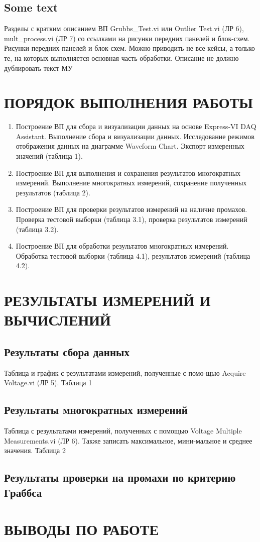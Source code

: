\documentclass[a4paper,14pt]{article}
\begin{document}
\subsection{Some text}
Разделы с кратким описанием ВП Grubbs\_Test.vi или Outlier Test.vi (ЛР 6), mult\_process.vi (ЛР 7) со ссылками на рисунки передних панелей и блок-схем. Рисунки передних панелей и блок-схем. Можно приводить не все кейсы, а только те, на которых выполняется основная часть обработки. Описание не должно дублировать текст МУ 

\section{ПОРЯДОК ВЫПОЛНЕНИЯ РАБОТЫ}
\begin{enumerate}
\item 	Построение ВП для сбора и визуализации данных на основе Express-VI DAQ Assistant.
 Выполнение сбора и визуализации данных. 
 Исследование режимов отображения данных на диаграмме Waveform Chart. 
 Экспорт измеренных значений (таблица 1).
\item 	Построение ВП для выполнения и сохранения результатов многократных измерений.
 Выполнение многократных измерений, сохранение полученных результатов (таблица 2).
\item 	Построение ВП для проверки результатов измерений на наличие промахов. 
Проверка тестовой выборки (таблица 3.1), проверка результатов измерений (таблица  3.2).
\item 	Построение ВП для обработки результатов многократных измерений. 
Обработка тестовой выборки (таблица 4.1), результатов измерений (таблица 4.2).
\end{enumerate}

\section{ РЕЗУЛЬТАТЫ ИЗМЕРЕНИЙ И ВЫЧИСЛЕНИЙ}

\subsection{Результаты сбора данных}
Таблица и график с результатами измерений, полученные с помо-щью Acquire Voltage.vi (ЛР 5). 
Таблица 1
\subsection{Результаты многократных измерений}

Таблица с результатами измерений, полученных с помощью Voltage Multiple Measurements.vi (ЛР 6). Также записать максимальное, мини-мальное и среднее значения. 
Таблица 2
\subsection{Результаты проверки на промахи по критерию Граббса}

\section{ВЫВОДЫ ПО РАБОТЕ}
\end{document}
